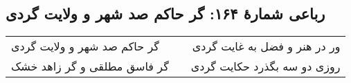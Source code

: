 \begin{center}
\section*{رباعی شمارهٔ ۱۶۴: گر حاکم صد شهر و ولایت گردی}
\label{sec:164}
\begin{longtable}{l p{0.5cm} r}
گر حاکم صد شهر و ولایت گردی
&&
ور در هنر و فضل به غایت گردی
\\
گر فاسق مطلقی و گر زاهد خشک
&&
روزی دو سه بگذرد حکایت گردی
\\
\end{longtable}
\end{center}
